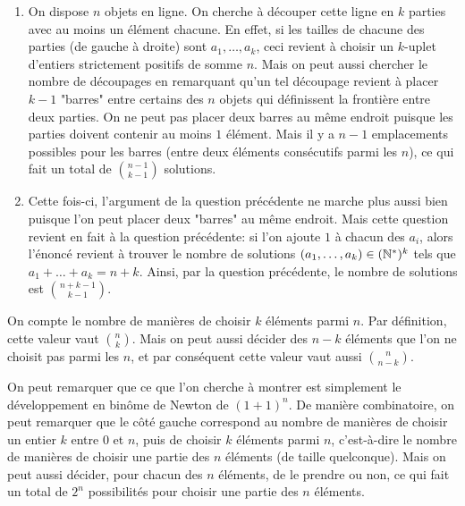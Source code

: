\begin{sol}
\begin{enumerate}
\item On dispose $n$ objets en ligne. On cherche à découper cette ligne en $k$ parties avec au moins un élément chacune. En effet, si les tailles de chacune des parties (de gauche à droite) sont $a_1,\ldots,a_k$, ceci revient à choisir un $k$-uplet d'entiers strictement positifs de somme $n$. Mais on peut aussi chercher le nombre de découpages en remarquant qu'un tel découpage revient à placer $k-1$ "barres" entre certains des $n$ objets qui définissent la frontière entre deux parties. On ne peut pas placer deux barres au même endroit puisque les parties doivent contenir au moins $1$ élément. Mais il y a $n-1$ emplacements possibles pour les barres (entre deux éléments consécutifs parmi les $n$), ce qui fait un total de $\binom{n-1}{k-1}$ solutions.
\item Cette fois-ci, l'argument de la question précédente ne marche plus aussi bien puisque l'on peut placer deux "barres" au même endroit. Mais cette question revient en fait à la question précédente: si l'on ajoute $1$ à chacun des $a_i$, alors l'énoncé revient à trouver le nombre de solutions $(a_1,\ldots,a_k)\in(\mathbb N^*)^k$ tels que $a_1+\ldots+a_k = n+k$. Ainsi, par la question précédente, le nombre de solutions est $\binom{n+k-1}{k-1}$.
\end{enumerate}
\end{sol}

\begin{sol}
On compte le nombre de manières de choisir $k$ éléments parmi $n$. Par définition, cette valeur vaut $\binom nk$. Mais on peut aussi décider des $n-k$ éléments que l'on ne choisit pas parmi les $n$, et par conséquent cette valeur vaut aussi $\binom n{n-k}$.
\end{sol}

\begin{sol}
On peut remarquer que ce que l'on cherche à montrer est simplement le développement en binôme de Newton de $(1+1)^n$. De manière combinatoire, on peut remarquer que le côté gauche correspond au nombre de manières de choisir un entier $k$ entre $0$ et $n$, puis de choisir $k$ éléments parmi $n$, c'est-à-dire le nombre de manières de choisir une partie des $n$ éléments (de taille quelconque). Mais on peut aussi décider, pour chacun des $n$ éléments, de le prendre ou non, ce qui fait un total de $2^n$ possibilités pour choisir une partie des $n$ éléments.
\end{sol}


